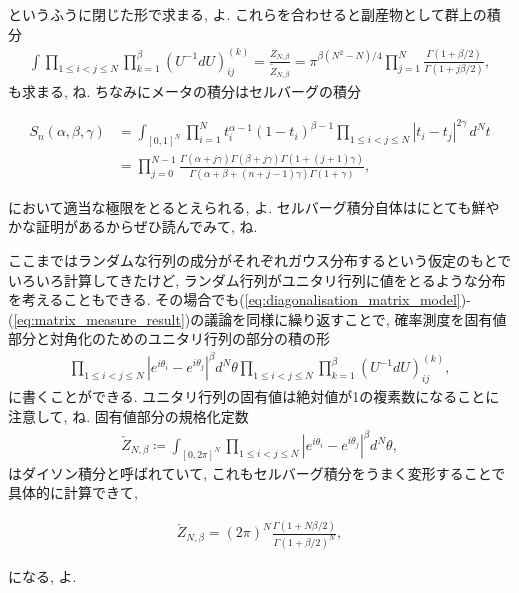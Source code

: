 \documentclass{ltjsarticle}
\theoremstyle{definition}
\newcommand{\parno}{\par\noindent}
\begin{document}
\parno
というふうに閉じた形で求まる, よ. これらを合わせると副産物として群上の積分
\begin{gather}
  \int\prod_{1\le i<j\le N}\prod_{k=1}^\beta\left(U^{-1}dU\right)_{ij}^{(k)}=\frac{Z_{N,\beta}}{\tilde Z_{N,\beta}}=\pi^{\beta(N^2-N)/4}\prod_{j=1}^N\frac{\Gamma(1+\beta/2)}{\Gamma(1+j\beta/2)},
\end{gather}
も求まる, ね. ちなみにメータの積分はセルバーグの積分
\begin{tcolorbox}
\begin{align}
  S_n(\alpha,\beta,\gamma)&=\int_{[0,1]^N}\prod_{i=1}^Nt_i^{\alpha-1}(1-t_i)^{\beta-1}
\prod_{1\le i<j\le N}|t_i-t_j|^{2\gamma}\,d^Nt\\
  &=\prod_{j=0}^{N-1}\frac{\Gamma(\alpha+j\gamma)\Gamma(\beta+j\gamma)\Gamma(1+(j+1)\gamma)}{\Gamma(\alpha+\beta+(n+j-1)\gamma)\Gamma(1+\gamma)},
\end{align}
\end{tcolorbox}
\parno
において適当な極限をとるとえられる, よ. セルバーグ積分自体は\cite{bib_selberg_integral}にとても鮮やかな証明があるからぜひ読んでみて, ね.\par
ここまではランダムな行列の成分がそれぞれガウス分布するという仮定のもとでいろいろ計算してきたけど, ランダム行列がユニタリ行列に値をとるような分布を考えることもできる. その場合でも(\ref{eq:diagonalisation_matrix_model})-(\ref{eq:matrix_measure_result})の議論を同様に繰り返すことで, 確率測度を固有値部分と対角化のためのユニタリ行列の部分の積の形
\begin{gather}
  \prod_{1\le i<j\le N}\left|e^{i\theta_i}-e^{i\theta_j}\right|^\beta d^N\theta\prod_{1\le i<j\le N}\prod_{k=1}^\beta\left(U^{-1}dU\right)_{ij}^{(k)},
\end{gather}
に書くことができる. ユニタリ行列の固有値は絶対値が1の複素数になることに注意して, ね. 固有値部分の規格化定数
\begin{gather}
  \check Z_{N,\beta}\coloneqq\int_{[0,2\pi]^N}\prod_{1\le i<j\le N}\left|e^{i\theta_i}-e^{i\theta_j}\right|^\beta d^N\theta,
\end{gather}
はダイソン積分と呼ばれていて, これもセルバーグ積分をうまく変形することで具体的に計算できて,
\begin{tcolorbox}
\begin{gather}
  \check Z_{N,\beta}=(2\pi)^N\frac{\Gamma(1+N\beta/2)}{\Gamma(1+\beta/2)^N},
\end{gather}
\end{tcolorbox}
\parno
になる, よ.
\end{document}
